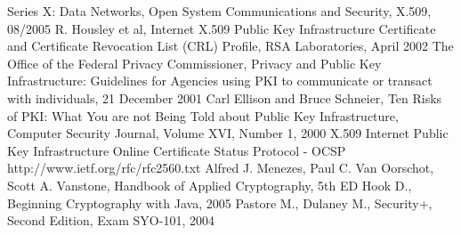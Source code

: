 \documentclass[a4paper,10pt]{article}
\begin{document}
\begin{thebibliography}{99}
	Series X: Data Networks, Open System Communications and
Security, X.509, 08/2005
		R. Housley et al, Internet X.509 Public Key
Infrastructure Certificate and Certificate Revocation List (CRL) Profile, RSA
Laboratories, April 2002
	The Office of the Federal Privacy Commissioner,
Privacy and Public Key Infrastructure: Guidelines for Agencies using PKI to
communicate or transact with individuals, 21 December 2001
	 Carl Ellison and Bruce Schneier, Ten Risks of PKI:
What You are not Being Told about Public Key Infrastructure, Computer Security
Journal, Volume XVI, Number 1, 2000
	 X.509 Internet Public Key Infrastructure Online
Certificate Status Protocol - OCSP http://www.ietf.org/rfc/rfc2560.txt	
	Alfred J. Menezes, Paul C. Van Oorschot, Scott A.
Vanstone, Handbook of Applied Cryptography, 5th ED
	Hook D., Beginning Cryptography with Java, 2005
	Pastore M., Dulaney M., Security+, Second
Edition, Exam SYO-101, 2004
\end{thebibliography}
\end{document}
